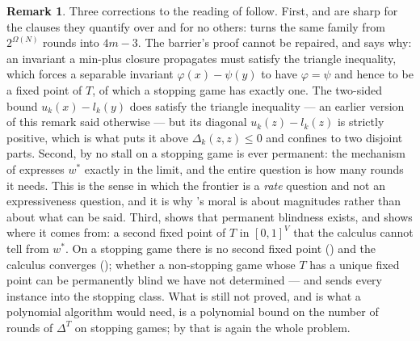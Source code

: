 \documentclass[11pt]{article}
\theoremstyle{plain}
\theoremstyle{definition}
\newtheorem{remark}[theorem]{Remark}
\begin{document}
\begin{remark}\label{rem:trans}
Three corrections to the reading of  follow.
First,  and  are sharp for
the clauses they quantify over and for no others:
 turns the same family from $2^{\Omega(N)}$ rounds
into $4m-3$. The barrier's proof cannot be repaired, and
 says why: an invariant a min-plus closure
propagates must satisfy the triangle inequality, which forces a
separable invariant $\varphi(x)-\psi(y)$ to have $\varphi=\psi$ and
hence to be a fixed point of $T$, of which a stopping game has exactly
one. The two-sided bound $u_k(x)-l_k(y)$ does satisfy the triangle
inequality --- an earlier version of this remark said otherwise --- but
its diagonal $u_k(z)-l_k(z)$ is strictly positive, which is what puts it
above $\Delta_k(z,z)\le0$ and confines  to two
disjoint parts.
Second, by  no stall on a stopping game is ever
permanent: the mechanism of  expresses $w^\ast$ exactly in
the limit, and the entire question is how many rounds it needs. This is
the sense in which the frontier is a \emph{rate} question and not an
expressiveness question, and it is why 's moral is
about magnitudes rather than about what can be said.
Third,  shows that permanent blindness exists,
and  shows where it comes from: a second fixed
point of $T$ in $[0,1]^{V}$ that the calculus cannot tell from $w^\ast$.
On a stopping game there is no second fixed point ()
and the calculus converges (); whether a
non-stopping game whose $T$ has a unique fixed point can be permanently
blind we have not determined --- and  sends
every instance into the stopping class. What is still not proved, and is what a polynomial
algorithm would need, is a polynomial bound on the number of rounds of
$\Delta^{T}$ on stopping games; by  that is
again the whole problem.
\end{remark}
\end{document}
